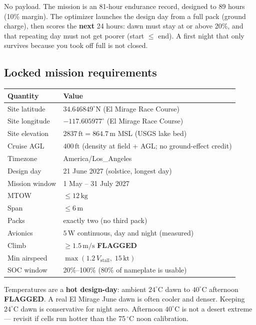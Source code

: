 \documentclass[11pt,letterpaper]{article}
\newcommand{\flag}{\textcolor{red!60!black}{\textbf{FLAGGED}}}
\begin{document}
No payload. The mission is an 81-hour endurance record, designed to 89 hours (10\% margin). The optimizer launches the design day from a full pack (ground charge), then scores the \textbf{next} 24 hours: dawn must stay at or above 20\%, and that repeating day must not get poorer (start $\le$ end). A first night that only survives because you took off full is not closed.

\subsection{Locked mission requirements}

\begin{center}
\begin{tabular}{@{}ll@{}}
\toprule
Quantity & Value \\
\midrule
Site latitude & $34.646849^\circ\mathrm{N}$ (El Mirage Race Course) \\
Site longitude & $-117.605977^\circ$ (El Mirage Race Course) \\
Site elevation & $2837\,\mathrm{ft} = 864.7\,\mathrm{m}$ MSL (USGS lake bed) \\
Cruise AGL & $400\,\mathrm{ft}$ (density at field + AGL; no ground-effect credit) \\
Timezone & America/Los\_Angeles \\
Design day & 21 June 2027 (solstice, longest day) \\
Mission window & 1 May -- 31 July 2027 \\
MTOW & $\le 12\,\mathrm{kg}$ \\
Span & $\le 6\,\mathrm{m}$ \\
Packs & exactly two (no third pack) \\
Avionics & $5\,\mathrm{W}$ continuous, day and night (measured) \\
Climb & $\ge 1.5\,\mathrm{m/s}$ \flag{} \\
Min airspeed & $\max(1.2\,V_\mathrm{stall},\; 15\,\mathrm{kt})$ \\
SOC window & 20\%--100\% (80\% of nameplate is usable) \\
\bottomrule
\end{tabular}
\end{center}

Temperatures are a \textbf{hot design-day}: ambient $24^\circ\mathrm{C}$ dawn to $40^\circ\mathrm{C}$ afternoon \flag{}. A real El Mirage June dawn is often cooler and denser. Keeping $24^\circ\mathrm{C}$ dawn is conservative for night aero. Afternoon $40^\circ\mathrm{C}$ is not a desert extreme --- revisit if cells run hotter than the 75\,$^\circ\mathrm{C}$ noon calibration.
\end{document}
